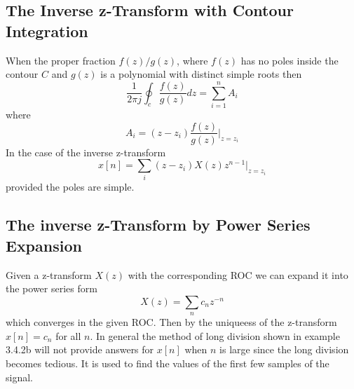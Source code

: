 \documentclass{article} %
\begin{document}
	\subsection{The Inverse z-Transform with Contour Integration}
	When the proper fraction $f(z)/g(z)$, where $f(z)$ has no poles inside the contour $C$ and $g(z)$ is a polynomial with distinct simple roots then
	\begin{equation}
	\frac{1}{2\pi j} \oint_c \frac{f(z)}{g(z)}dz = \sum_{i=1}^n A_i
	\end{equation}
	where
	\begin{equation}
	A_i = (z-z_i)\frac{f(z)}{g(z)}|_{z=z_i}
	\end{equation}
	In the case of the inverse z-transform
	\begin{equation}
	x[n] = \sum_i (z-z_i)X(z)z^{n-1}|_{z=z_i}
	\end{equation}
	provided the poles are simple.
	
	\subsection{The inverse z-Transform by Power Series Expansion}
	Given a z-transform $X(z)$ with the corresponding ROC we can expand it into the power series form
	\begin{equation}
	X(z) = \sum_n c_nz^{-n}
	\end{equation}
	which converges in the given ROC. Then by the uniqueess of the z-transform $x[n] = c_n$ for all $n$. In general the method of long division shown in example 3.4.2b will not provide answers for $x[n]$ when $n$ is large since the long division becomes tedious. It is used to find the values of the first few samples of the signal.
	
\end{document}

